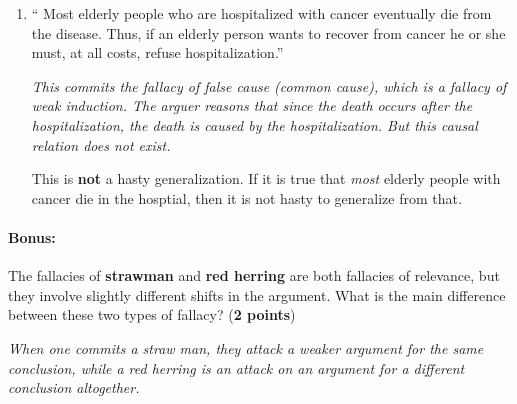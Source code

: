 \documentclass[10pt]{article}
\begin{document}
\begin{enumerate}
  \item `` Most elderly people who are hospitalized with cancer eventually die from the disease. Thus, if an elderly person wants to recover from cancer he or she must, at all costs, refuse hospitalization.''
  
\textit{This commits the fallacy of false cause (common cause), which is a fallacy of weak induction.  The arguer reasons that since the death occurs after the hospitalization, the death is caused by the hospitalization.  But this causal relation does not exist.}

This is \textbf{not} a hasty generalization.  If it is true that \textit{most} elderly people with cancer die in the hosptial, then it is not hasty to generalize from that.

\end{enumerate}  

\vspace{1in}
  
\paragraph{Bonus:}  The fallacies of \textbf{strawman} and \textbf{red herring} are both fallacies of relevance, but they involve slightly different shifts in the argument.  What is the main difference between these two types of fallacy? (\textbf{2 points})

\textit{When one commits a straw man, they attack a weaker argument for the same conclusion, while a red herring is an attack on an argument for a different conclusion altogether.}
\end{document}
